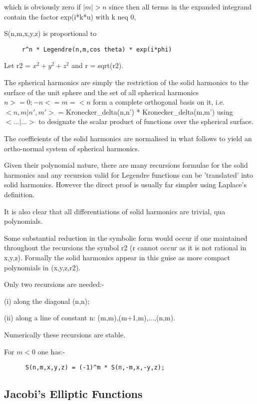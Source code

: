 which is obviously zero if $|m| > n$ since then all terms in the
expanded integrand contain the factor exp(i*k*u) with k neq 0,

S(n,m,x,y,z) is proportional to
\begin{verbatim}
     r^n * Legendre(n,m,cos theta) * exp(i*phi)
\end{verbatim}

Let r2 = $x^2 + y^2 + z^2$ and r = sqrt(r2).

The spherical harmonics are simply the restriction of the solid
harmonics to the surface of the unit sphere and the set of all
spherical harmonics {$n >=0; -n <= m =< n$} form a complete orthogonal
basis on it, i.e. $<n,m|n',m'>$ = Kronecker\_delta(n,n') *
Kronecker\_delta(m,m') using
$<...|...>$ to designate the scalar product
of functions over the spherical surface.

The coefficients of the solid harmonics are normalised in what
follows to yield an ortho-normal system of spherical harmonics.

Given their polynomial nature, there are many recursions formulae
for the solid harmonics and any recursion valid for Legendre functions
can be 'translated' into solid harmonics. However the direct proof is
usually far simpler using Laplace's definition.

It is also clear that all differentiations of solid harmonics are
trivial, qua polynomials.

Some substantial reduction in the symbolic form would occur if one
maintained throughout the recursions the symbol r2 (r cannot occur
as it is not rational in x,y,z). Formally the solid harmonics appear
in this guise as more compact polynomials in (x,y,z,r2).

Only two recursions are needed:-

(i) along the diagonal (n,n);

(ii) along a line of constant n: (m,m),(m+1,m),...,(n,m).

Numerically these recursions are stable.

For $m < 0$ one has:-

\begin{verbatim}
      S(n,m,x,y,z) = (-1)^m * S(n,-m,x,-y,z);
\end{verbatim}

\subsection{Jacobi's Elliptic Functions}

